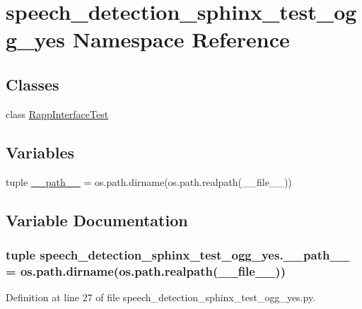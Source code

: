 \hypertarget{namespacespeech__detection__sphinx__test__ogg__yes}{\section{speech\-\_\-detection\-\_\-sphinx\-\_\-test\-\_\-ogg\-\_\-yes Namespace Reference}
\label{namespacespeech__detection__sphinx__test__ogg__yes}
}
\subsection*{Classes}
\begin{DoxyCompactItemize}
\item 
class \hyperlink{classspeech__detection__sphinx__test__ogg__yes_1_1RappInterfaceTest}{Rapp\-Interface\-Test}
\end{DoxyCompactItemize}
\subsection*{Variables}
\begin{DoxyCompactItemize}
\item 
tuple \hyperlink{namespacespeech__detection__sphinx__test__ogg__yes_a17237cbecd332e777de96eb0e37895a2}{\-\_\-\-\_\-path\-\_\-\-\_\-} = os.\-path.\-dirname(os.\-path.\-realpath(\-\_\-\-\_\-file\-\_\-\-\_\-))
\end{DoxyCompactItemize}


\subsection{Variable Documentation}
\hypertarget{namespacespeech__detection__sphinx__test__ogg__yes_a17237cbecd332e777de96eb0e37895a2}{
\subsubsection[{\-\_\-\-\_\-path\-\_\-\-\_\-}]{\setlength{\rightskip}{0pt plus 5cm}tuple speech\-\_\-detection\-\_\-sphinx\-\_\-test\-\_\-ogg\-\_\-yes.\-\_\-\-\_\-path\-\_\-\-\_\- = os.\-path.\-dirname(os.\-path.\-realpath(\-\_\-\-\_\-file\-\_\-\-\_\-))}}\label{namespacespeech__detection__sphinx__test__ogg__yes_a17237cbecd332e777de96eb0e37895a2}


Definition at line 27 of file speech\-\_\-detection\-\_\-sphinx\-\_\-test\-\_\-ogg\-\_\-yes.\-py.

